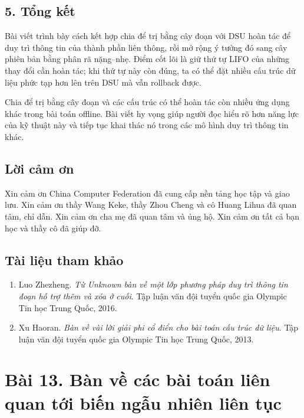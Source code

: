 \documentclass[11pt]{article}
\begin{document}
\subsection*{5. Tổng kết}

Bài viết trình bày cách kết hợp chia để trị bằng cây đoạn với DSU hoàn tác để
duy trì thông tin của thành phần liên thông, rồi mở rộng ý tưởng đó sang cây
phiên bản bằng phân rã nặng--nhẹ. Điểm cốt lõi là giữ thứ tự LIFO của những
thay đổi cần hoàn tác; khi thứ tự này còn đúng, ta có thể đặt nhiều cấu trúc
dữ liệu phức tạp hơn lên trên DSU mà vẫn rollback được.

Chia để trị bằng cây đoạn và các cấu trúc có thể hoàn tác còn nhiều ứng dụng
khác trong bài toán offline. Bài viết hy vọng giúp người đọc hiểu rõ hơn năng
lực của kỹ thuật này và tiếp tục khai thác nó trong các mô hình duy trì thông
tin khác.

\subsection*{Lời cảm ơn}

Xin cảm ơn China Computer Federation đã cung cấp nền tảng học tập và giao lưu.
Xin cảm ơn thầy Wang Keke, thầy Zhou Cheng và cô Huang Lihua đã quan tâm, chỉ
dẫn. Xin cảm ơn cha mẹ đã quan tâm và ủng hộ. Xin cảm ơn tất cả bạn học và
thầy cô đã giúp đỡ.

\subsection*{Tài liệu tham khảo}

\begin{enumerate}
  \item Luo Zhezheng. \emph{Từ Unknown bàn về một lớp phương pháp duy trì thông
  tin đoạn hỗ trợ thêm và xóa ở cuối}. Tập luận văn đội tuyển quốc gia Olympic
  Tin học Trung Quốc, 2016.
  \item Xu Haoran. \emph{Bàn về vài lời giải phi cổ điển cho bài toán cấu trúc
  dữ liệu}. Tập luận văn đội tuyển quốc gia Olympic Tin học Trung Quốc, 2013.
\end{enumerate}

\section*{Bài 13. Bàn về các bài toán liên quan tới biến ngẫu nhiên liên tục}
\end{document}
